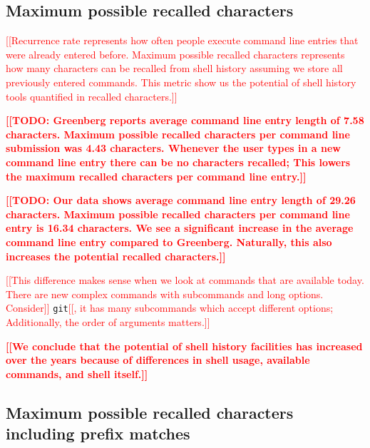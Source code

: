 \documentclass[thesis=M,english]{FITthesis}[2012/10/20]
\newcommand{\todotext}[1]{\textcolor{red}{\textbf{[[#1]]}}}
\newcommand{\redtext}[1]{\textcolor{red}{[[#1]]}}
\newcommand{\tmpframe}[1]{\fbox{#1}}
\begin{document}


\subsection{Maximum possible recalled characters}

\redtext{Recurrence rate represents how often people execute command line entries that were already entered before. Maximum possible recalled characters represents how many characters can be recalled from shell history assuming we store all previously entered commands. This metric show us the potential of shell history tools quantified in recalled characters.}

\todotext{TODO: Greenberg reports average command line entry length of 7.58 characters. Maximum possible recalled characters per command line submission was 4.43 characters. Whenever the user types in a new command line entry there can be no characters recalled; This lowers the maximum recalled characters per command line entry.}

\todotext{TODO: Our data shows average command line entry length of 29.26 characters. Maximum possible recalled characters per command line entry is 16.34 characters. We see a significant increase in the average command line entry compared to Greenberg. Naturally, this also increases the potential recalled characters.}

\redtext{This difference makes sense when we look at commands that are available today. There are new complex commands with subcommands and long options. Consider} \verb|git|\redtext{, it has many subcommands which accept different options; Additionally, the order of arguments matters.}


\todotext{We conclude that the potential of shell history facilities has increased over the years because of differences in shell usage, available commands, and shell itself.}

\subsection{Maximum possible recalled characters including prefix matches}
\end{document}
